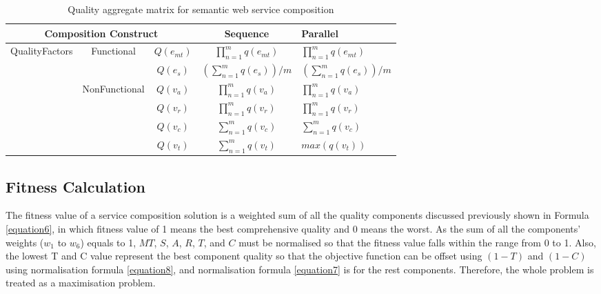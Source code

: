 \documentclass{llncs}
\begin{document}
\begin{table}[]
\centering
\caption{Quality aggregate matrix for semantic web service composition}
\label{table1}
\begin{tabular}{|c|c|c|c|l|}
\hline
\multicolumn{3}{|c|}{Composition Construct}                                      & Sequence                             & Parallel \\ \hline
\multirow{5}{*}{QualityFactors} & \multirow{2}{*}{Functional}    & $Q(e_ {mt})$  &$\prod_{n=1}^{m} q(e_ {mt})$          &  $\prod_{n=1}^{m} q(e_ {mt})$ \\ \cline{3-5}
                                &                                & $Q(e_ {s})$  & $(\sum_{n=1}^m q(e_ {s}))/m$        &  $(\sum_{n=1}^m q(e_ {s}))/m$  \\ \cline{2-5}   
                                & \multirow{4}{*}{NonFunctional} & $Q(v_{a})$    & $\prod_{n=1}^{m} q(v_a)$             &  $\prod_{n=1}^{m} q(v_a)$ \\ \cline{3-5} 
                                &                                & $Q(v_{r})$    & $\prod_{n=1}^{m} q(v_r)$             &  $\prod_{n=1}^{m} q(v_r)$ \\ \cline{3-5} 
                                &                                & $Q(v_{c})$    & $\sum_{n=1}^m q(v_ {c})$             &  $\sum_{n=1}^m q(v_ {c})$ \\ \cline{3-5} 
                                &                                & $Q(v_{t})$    & $\sum_{n=1}^m q(v_ {t})$             &  $max(q(v_ {t}))$ \\ \hline
\end{tabular}
\end{table}

\subsection{Fitness Calculation}
The fitness value of a service composition solution is a weighted sum of all the quality components discussed previously shown in Formula \ref{equation6}, in which fitness value of 1 means the best comprehensive quality and 0 means the worst. As the sum of all the components' weights ($w_1$ to $w_6$) equals to 1, $MT$, $S$, $A$, $R$, $T$, and $C$ must be normalised so that the fitness value falls within the range from 0 to 1. Also, the lowest T and C value represent the best component quality so that the objective function can be offset using $(1 - T)$ and $(1 - C)$ using normalisation formula \ref{equation8}, and normalisation formula \ref{equation7} is for the rest components. Therefore, the whole problem is treated as a maximisation problem.
\end{document}
